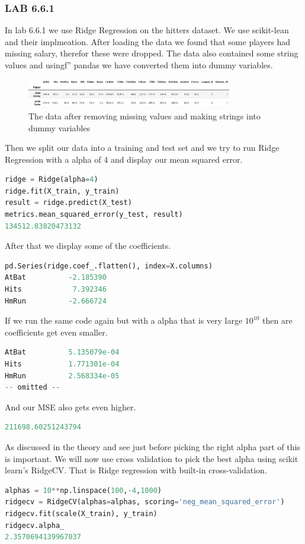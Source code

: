 \subsubsection*{LAB 6.6.1}%
In lab 6.6.1 we use Ridge Regression on the hitters dataset. We use scikit-lean and their implmeation. After loading the data we found that some players had missing salary, therefor these were dropped. The data also contained some string values and usingf'' pandas we have converted them into dummy variables.  
\begin{figure}[H]
	\centering
	\includegraphics[width=0.8\textwidth]{shrinkageMethods/fig/data.png}
	\caption{The data after removing missing values and making strings into dummy variables }
	\label{fig:lab661_data}
\end{figure}
Then we split our data into a training and test set and we try to run Ridge Regression with a alpha of 4 and display our mean squared error.
\begin{lstlisting}[language=Python]
ridge = Ridge(alpha=4)
ridge.fit(X_train, y_train)
result = ridge.predict(X_test)
metrics.mean_squared_error(y_test, result)
134512.83820473132
\end{lstlisting}
After that we display some of the coefficients.
\begin{lstlisting}[language=Python]
pd.Series(ridge.coef_.flatten(), index=X.columns)
AtBat          -2.185390
Hits            7.392346
HmRun          -2.666724
\end{lstlisting}
If we run the same code again but with a alpha that is very large $10^10$ then are coefficients get even smaller.
\begin{lstlisting}[language=Python]
AtBat          5.135079e-04
Hits           1.771301e-04
HmRun          2.568334e-05
-- omitted --
\end{lstlisting}
And our MSE also gets even higher.
\begin{lstlisting}[language=Python]
211698.60251243794
\end{lstlisting}
As discussed in the theory and see just before picking the right alpha part of this is important. We will now use cross validation to pick the best alpha using scikit learn's RidgeCV. That is Ridge regression with built-in cross-validation.
\begin{lstlisting}[language=Python]
alphas = 10**np.linspace(100,-4,1000)
ridgecv = RidgeCV(alphas=alphas, scoring='neg_mean_squared_error')
ridgecv.fit(scale(X_train), y_train)
ridgecv.alpha_
2.3570694139967037
\end{lstlisting}
